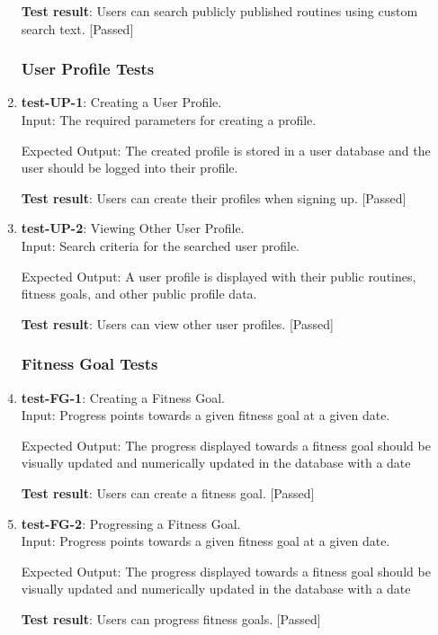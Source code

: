 \documentclass[12pt, titlepage]{article}
\begin{document}
\begin{enumerate}
    \textbf{Test result}: Users can search publicly published routines using custom search text. [Passed]
   
\subsubsection{User Profile Tests}
    \item{\textbf{test-UP-1}}: Creating a User Profile.\\
    Input: The required parameters for creating a profile.
	
    Expected Output: The created profile is stored in a user database and the user should be logged into their profile.
    
    \textbf{Test result}: Users can create their profiles when signing up. [Passed]
   
    \item{\textbf{test-UP-2}}: Viewing Other User Profile.\\
    Input: Search criteria for the searched user profile.
	
    Expected Output: A user profile is displayed with their public routines, fitness goals, and other public profile data.
    
    \textbf{Test result}: Users can view other user profiles. [Passed]
   
\subsubsection{Fitness Goal Tests}
    \item{\textbf{test-FG-1}}: Creating a Fitness Goal.\\
    Input: Progress points towards a given fitness goal at a given date.
	
    Expected Output: The progress displayed towards a fitness goal should be visually updated and numerically updated in the database with a date
    
    \textbf{Test result}: Users can create a fitness goal. [Passed]
   
    \item{\textbf{test-FG-2}}: Progressing a Fitness Goal.\\
    Input: Progress points towards a given fitness goal at a given date.
	
    Expected Output: The progress displayed towards a fitness goal should be visually updated and numerically updated in the database with a date
    
    \textbf{Test result}: Users can progress fitness goals. [Passed]
 
\end{enumerate}
\end{document}

